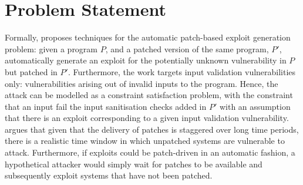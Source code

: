 \section{Problem Statement} \label{prob_st}
Formally, \ap proposes techniques for the automatic patch-based exploit generation problem: given a program $P$, and a patched version of the same program, $P'$, automatically generate an exploit for the potentially unknown vulnerability in $P$ but patched in $P'$. Furthermore, the work targets input validation vulnerabilities only: vulnerabilities arising out of invalid inputs to the program. Hence, the attack can be modelled as a constraint satisfaction problem, with the constraint that an input fail the input sanitisation checks added in $P'$ with an assumption that there is an exploit corresponding to a given input validation vulnerability. \ap argues that given that the delivery of patches is staggered over long time periods, there is a realistic time window in which unpatched systems are vulnerable to attack. Furthermore, if exploits could be patch-driven in an automatic fashion, a hypothetical attacker would simply wait for patches to be available and subsequently exploit systems that have not been patched.

